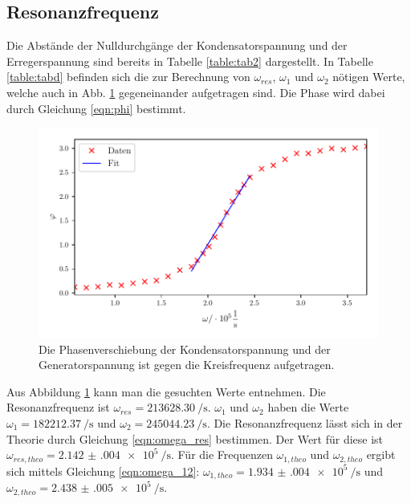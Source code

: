 \subsection{Resonanzfrequenz} %
Die Abstände der Nulldurchgänge der Kondensatorspannung und
der Erregerspannung sind bereits in Tabelle \ref{table:tab2}
dargestellt. In Tabelle \ref{table:tabd} befinden sich die
zur Berechnung von $\omega_{res}$, $\omega_{1}$ und $\omega_{2}$
nötigen Werte, welche auch in Abb. \ref{fig:plotd} gegeneinander
aufgetragen sind. Die Phase wird dabei durch Gleichung \eqref{eqn:phi}
bestimmt.

\begin{figure}
  \centering
  \includegraphics{build/plotd.pdf}
  \caption{Die Phasenverschiebung der Kondensatorspannung und der
  Generatorspannung ist gegen die Kreisfrequenz aufgetragen.} %
  \label{fig:plotd}
\end{figure}
\noindent Aus Abbildung \ref{fig:plotd} kann man die gesuchten Werte entnehmen. %
Die Resonanzfrequenz ist $\omega_{res} = \SI[per-mode=fraction]{213628.30}{\per\second}$.
$\omega_{1}$ und $\omega_{2}$ haben die Werte
$\omega_{1} = \SI[per-mode=fraction]{182212.37}{\per\second}$ und
$\omega_{2} = \SI[per-mode=fraction]{245044.23}{\per\second}$.
\newline
Die Resonanzfrequenz lässt sich in der Theorie durch 
Gleichung \eqref{eqn:omega_res} bestimmen.
Der Wert für diese ist $\omega_{res,theo} = \SI[per-mode=fraction]{2.142(004)e5}{\per\second}$.
Für die Frequenzen $\omega_{1,theo}$ und $\omega_{2,theo}$ ergibt sich
mittels Gleichung \eqref{eqn:omega_12}:
$\omega_{1,theo} = \SI[per-mode=fraction]{1.934(004)e5}{\per\second}$ und
$\omega_{2,theo} = \SI[per-mode=fraction]{2.438(005)e5}{\per\second}$.
